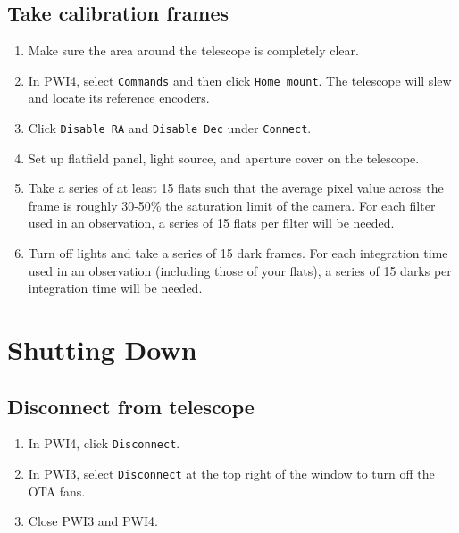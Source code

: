 \documentclass{article}
\begin{document}
	\subsection{Take calibration frames}
		
		\begin{enumerate}
			
			\item Make sure the area around the telescope is completely clear.
			
			\item In PWI4, select \texttt{Commands} and then click \texttt{Home mount}. The telescope will slew and locate its reference encoders.
			
			\item Click \texttt{Disable RA} and \texttt{Disable Dec} under \texttt{Connect}.
			
			\item Set up flatfield panel, light source, and aperture cover on the telescope.
			
			\item Take a series of at least 15 flats such that the average pixel value across the frame is roughly 30-50\% the saturation limit of the camera. For each filter used in an observation, a series of 15 flats per filter will be needed.
			
			\item Turn off lights and take a series of 15 dark frames. For each integration time used in an observation (including those of your flats), a series of 15 darks per integration time will be needed.
			
		\end{enumerate}
			
	\newpage
	\section{Shutting Down}
	
	\subsection{Disconnect from telescope}
		
		\begin{enumerate}
					
			\item In PWI4, click \texttt{Disconnect}.
			
			\item In PWI3, select \texttt{Disconnect} at the top right of the window to turn off the OTA fans.
			
			\item Close PWI3 and PWI4.
			
		\end{enumerate}
		
\end{document}
